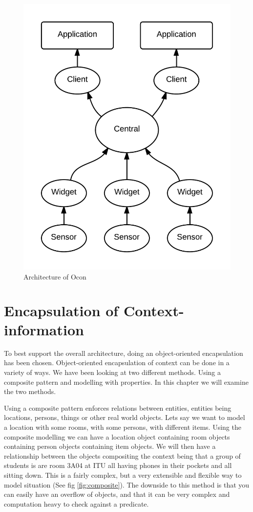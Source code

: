 \documentclass[../report.tex]{subfiles}
\begin{document}
\begin{figure}[H]
\centering
\includegraphics[scale=0.2]{grandarchitecture.png}
\caption{Architecture of Ocon}
\label{fig:GrandArchitecture}
\end{figure}

\section{Encapsulation of Context-information}

To best support the overall architecture, doing an object-oriented encapsulation has been chosen. Object-oriented encapsulation of context can be done in a variety of ways. We have been looking at two different methods. Using a composite pattern and modelling with properties. In this chapter we will examine the two methods.

Using a composite pattern enforces relations between entities, entities being locations, persons, things or other real world objects. Lets say we want to model a location with some rooms, with some persons, with different items. Using the composite modelling we can have a location object containing room objects containing person objects containing item objects. We will then have a relationship between the objects compositing the context being that a group of students is are room 3A04 at ITU all having phones in their pockets and all sitting down. This is a fairly complex, but a very extensible and flexible way to model situation (See fig \ref{fig:composite}). The downside to this method is that you can easily have an overflow of objects, and that it can be very complex and computation heavy to check against a predicate.
\end{document}
